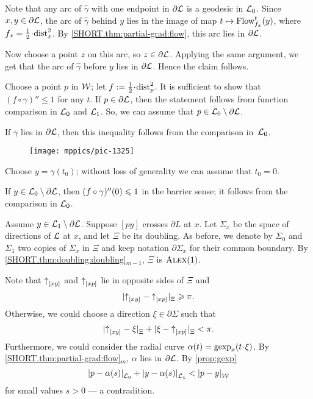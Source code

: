 Note that any arc of $\hat\gamma$ with one endpoint in $\partial \mathcal{L}$
is a geodesic in $\mathcal{L}_0$.
Since $x,y\in \partial \mathcal{L}$, the arc of $\hat\gamma$ behind $y$ lies in the image of map $t\mapsto \mathop{\rm Flow}\nolimits^t_{f_x}(y)$, where $f_x=\tfrac12\cdot\distfun^2_x$.
By \ref{SHORT.thm:partial-grad:flow}, this arc lies in $\partial\mathcal{L}$.

Now choose a point $z$ on this arc, so $z\in \partial\mathcal{L}$.
Applying the same argument, we get that the arc of $\hat\gamma$ before $y$ lies in $\partial\mathcal{L}$.
Hence the claim follows.\claimqeds

Choose a point $p$ in $\mathcal{W}$;
let $f\df\tfrac12\cdot\distfun_p^2$.
It is sufficient to show that $(f\circ\gamma)''\le 1$ for any $t$.
If $p\in \partial\mathcal{L}$, then the statement follows from function comparison in $\mathcal{L}_0$ and $\mathcal{L}_1$.
So, we can assume that $p\in \mathcal{L}_0\setminus \partial\mathcal{L}$.

If $\gamma$ lies in $\partial \mathcal{L}$, then this inequality follows from the comparison in~$\mathcal{L}_0$.

\begin{wrapfigure}{r}{55mm}
\vskip-2mm
\centering
\texttt{[image: mppics/pic-1325]}
\end{wrapfigure}

Choose $y=\gamma(t_0)$; without loss of generality we can assume that $t_0=0$.

If $y\z\in \spc{L}_0\setminus\partial\spc{L}$, then $(f\z\circ\gamma)''(0)\le 1$ in the barrier sense;
it follows from the comparison in $\mathcal{L}_0$.

Assume $y\in \mathcal{L}_1\setminus\partial\mathcal{L}$.
Suppose $[py]$ crosses $\partial L$ at $x$.
Let $\Sigma_x$ be the space of directions of $\mathcal{L}$ at $x$,
and let $\Xi$ be its doubling.
As before, we denote by $\Sigma_0$ and $\Sigma_1$ two copies of $\Sigma_x$ in  $\Xi$
and keep notation $\partial\Sigma_x$ for their common boundary.
By \ref{SHORT.thm:doubling:doubling}$_{m-1}$, $\Xi$ is $\textsc{Alex}(1)$.

Note that ${\uparrow}_{[{x}{y}]_{{}}}$ and ${\uparrow}_{[{x}{p}]_{{}}}$ lie in opposite sides of $\Xi$ and
\[\dist{\dir x{y}}{\dir xp}\Xi\ge \pi.\]
Otherwise, we could choose a direction $\xi\in\partial\Sigma$ such that
\[\dist{\dir x{y}}{\xi}\Xi+\dist{\xi}{\dir xp}\Xi<\pi.\]
Furthermore, we could consider the radial curve $\alpha(t)=\gexp_x(t\cdot \xi)$.
By \ref{SHORT.thm:partial-grad:flow}$_m$, $\alpha$ lies in $\partial \mathcal{L}$.
By \ref{prop:gexp}
\[\dist{p}{\alpha(s)}{\spc{L}_0}
+\dist{y}{\alpha(s)}{\spc{L}_1}
<\dist{p}{y}{\spc{W}}\]
for small values $s>0$
--- a contradition.

